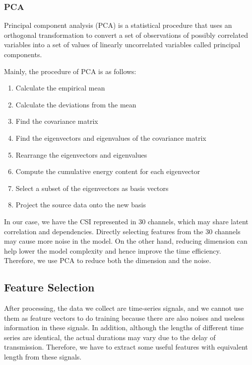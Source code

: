 \documentclass[conference]{IEEEtran}
\begin{document}
\subsubsection{PCA}
Principal component analysis (PCA) is a statistical procedure that uses an orthogonal transformation to convert a set of observations of possibly correlated variables into a set of values of linearly uncorrelated variables called principal components. 

Mainly, the procedure of PCA is as follows:
\begin{enumerate}
	\item Calculate the empirical mean
	\item Calculate the deviations from the mean
	\item Find the covariance matrix
	\item Find the eigenvectors and eigenvalues of the covariance matrix
	\item Rearrange the eigenvectors and eigenvalues
	\item Compute the cumulative energy content for each eigenvector
	\item Select a subset of the eigenvectors as basis vectors
	\item Project the source data onto the new basis
\end{enumerate}

In our case, we have the CSI represented in 30 channels, which may share latent correlation and dependencies. Directly selecting features from the 30 channels may cause more noise in the model.
On the other hand, reducing dimension can help lower the model complexity and hence improve the time efficiency.
Therefore, we use PCA to reduce both the dimension and the noise.

\subsection{Feature Selection}
After processing, the data we collect are time-series signals, and we cannot use them as feature vectors to do training because there are also noises and useless information in these signals. In addition, although the lengths of different time series are identical, the actual durations may vary due to the delay of transmission. Therefore, we have to extract some useful features with equivalent length from these signals.
\end{document}
